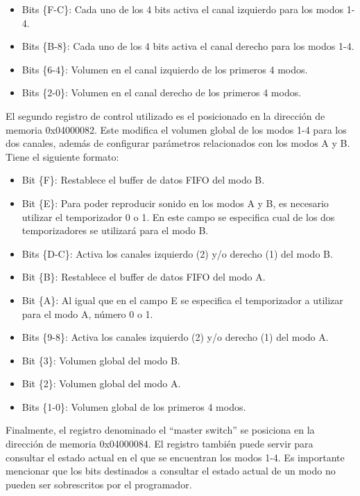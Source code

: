 {\begin{itemize}
	\item Bits \{F-C\}: Cada uno de los 4 bits activa el canal izquierdo para los modos 1-4.
	\item Bits \{B-8\}: Cada uno de los 4 bits activa el canal derecho para los modos 1-4.
	\item Bits \{6-4\}: Volumen en el canal izquierdo de los primeros 4 modos.
	\item Bits \{2-0\}: Volumen en el canal derecho de los primeros 4 modos.  
\end{itemize}

El segundo registro de control utilizado es el posicionado en la dirección de memoria 0x04000082. Este modifica el volumen global de los modos 1-4 para los dos canales, además de configurar parámetros relacionados con los modos A y B. Tiene el siguiente formato:

\begin{itemize}
	\item Bit \{F\}: Restablece el buffer de datos FIFO del modo B.
	\item Bit \{E\}: Para poder reproducir sonido en los modos A y B, es necesario utilizar el temporizador 0 o 1. En este campo se especifica cual de los dos temporizadores se utilizará para el modo B.
	\item Bits \{D-C\}: Activa los canales izquierdo (2) y/o derecho (1) del modo B.
	\item Bit \{B\}: Restablece el buffer de datos FIFO del modo A.
	\item Bit \{A\}: Al igual que en el campo {E} se especifica el temporizador a utilizar para el modo A, número 0 o 1.
	\item Bits \{9-8\}: Activa los canales izquierdo (2) y/o derecho (1) del modo A.  
	\item Bit \{3\}: Volumen global del modo B.  
	\item Bit \{2\}: Volumen global del modo A.  
	\item Bits \{1-0\}: Volumen global de los primeros 4 modos. 
\end{itemize}

Finalmente, el registro denominado el ``master switch'' se posiciona en la dirección de memoria 0x04000084. El registro también puede servir para consultar el estado actual en el que se encuentran los modos 1-4. Es importante mencionar que los bits destinados a consultar el estado actual de un modo no pueden ser sobrescritos por el programador.

}
